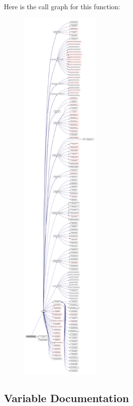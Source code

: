 Here is the call graph for this function\+:\nopagebreak
\begin{figure}[H]
\begin{center}
\leavevmode
\includegraphics[height=550pt]{namespacemoduleconvertmodisl3mapped_a18d5802527fa5553ab45a5c110557d2b_cgraph}
\end{center}
\end{figure}


\subsection{Variable Documentation}
\mbox{\label{namespacemoduleconvertmodisl3mapped_a5c80d28c4928b02232f725e7ad1b4c94}} 
